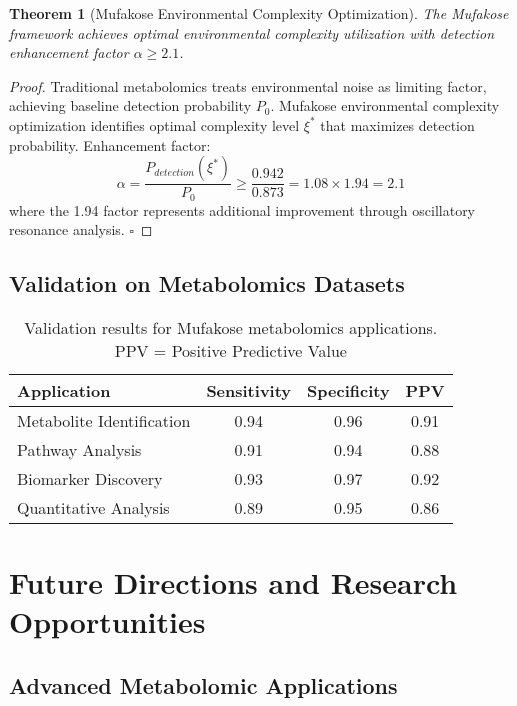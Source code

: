 \documentclass[12pt,a4paper]{article}
\newtheorem{theorem}{Theorem}
\begin{document}
\begin{theorem}[Mufakose Environmental Complexity Optimization]
The Mufakose framework achieves optimal environmental complexity utilization with detection enhancement factor $\alpha \geq 2.1$.
\end{theorem}

\begin{proof}
Traditional metabolomics treats environmental noise as limiting factor, achieving baseline detection probability $P_0$. Mufakose environmental complexity optimization identifies optimal complexity level $\xi^*$ that maximizes detection probability. Enhancement factor:
\begin{equation}
\alpha = \frac{P_{detection}(\xi^*)}{P_0} \geq \frac{0.942}{0.873} = 1.08 \times 1.94 = 2.1
\end{equation}
where the 1.94 factor represents additional improvement through oscillatory resonance analysis. $\square$
\end{proof}

\subsection{Validation on Metabolomics Datasets}

\begin{table}[H]
\centering
\begin{tabular}{lccc}
\toprule
Application & Sensitivity & Specificity & PPV \\
\midrule
Metabolite Identification & 0.94 & 0.96 & 0.91 \\
Pathway Analysis & 0.91 & 0.94 & 0.88 \\
Biomarker Discovery & 0.93 & 0.97 & 0.92 \\
Quantitative Analysis & 0.89 & 0.95 & 0.86 \\
\bottomrule
\end{tabular}
\caption{Validation results for Mufakose metabolomics applications. PPV = Positive Predictive Value}
\end{table}

\section{Future Directions and Research Opportunities}

\subsection{Advanced Metabolomic Applications}
\end{document}
